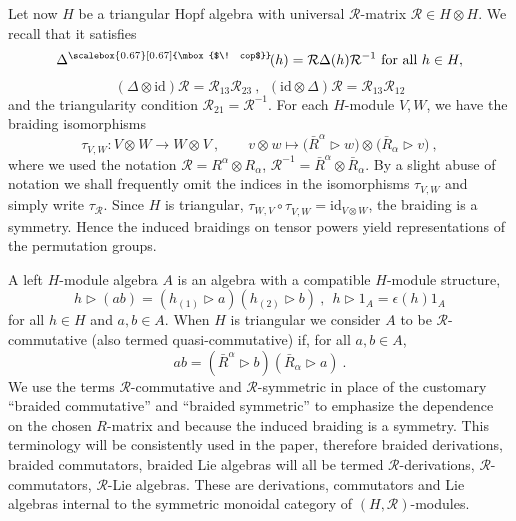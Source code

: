 \documentclass[12pt]{article}
\numberwithin{equation}{section}
\theoremstyle{plain}
\theoremstyle{definition}
\theoremstyle{remark}
\def\ra{\triangleright}
\def\AA{A}
\def\cop{{{\scalebox{0.67}[0.67]{\mbox{$\! cop$}}}\!}}
\def\hxi{h}
\begin{document}
Let now $H$ be a triangular Hopf
algebra with universal 
$\mathcal{R}$-matrix $\mathcal{R}\in H\otimes H$.
We recall that it satisfies
$$
\Delta^{\cop}(\hxi)
=\mathcal{R}\Delta(\hxi)\mathcal{R}^{-1}
\text{ for all }\hxi\in H,
$$
\begin{equation}\label{hexagon}
    (\Delta\otimes\mathrm{id})\mathcal{R}
    =\mathcal{R}_{13}\mathcal{R}_{23}
   ~,~~
    (\mathrm{id}\otimes\Delta)\mathcal{R}
    =\mathcal{R}_{13}\mathcal{R}_{12}
  \end{equation}
  and the triangularity condition ${\mathcal{R}}_{21}={\mathcal{R}}^{-1}$.
For each $H$-module $V,W$, we have the braiding isomorphisms
\begin{equation}\label{taubraiding}
\tau^{}_{V,W}: V \otimes^{} W \longrightarrow W \otimes^{} V ~, \qquad v \otimes^{} w 
\longmapsto 
\big(\bar R^{\alpha} \ra w\big) \otimes^{} \big(\bar R_{\alpha} \ra
v\big)~,
\end{equation}
where we used the notation $\mathcal{R}=R^\alpha\otimes R_\alpha$,
$\mathcal{R}^{-1}=\bar R^\alpha\otimes \bar R_\alpha$.
By a slight abuse of notation we  shall frequently omit the indices in the
isomorphisms $\tau^{}_{V,W}$ and simply write $\tau_{{\mathcal{R}}}$.
Since $H$ is triangular,  $\tau_{W,V}\circ \tau^{}_{V, W}=\mathrm{id}_{V\otimes W}$, the braiding is a symmetry. Hence the induced braidings on tensor powers yield representations of the permutation groups.


A left $H$-module algebra $A$ is an algebra with a compatible
$H$-module structure,
$$
\hxi\rhd(a b)=(\hxi_{(1)}\rhd a)(\hxi_{(2)}\rhd b) ~,~~
\hxi\rhd 1_{A}=\epsilon(\hxi)1_{A}
$$
for all $\hxi\in H$ and $a,b\in {A}$. 
When $H$ is triangular  we consider $\AA$ to be  ${\mathcal{R}}$-commutative (also termed quasi-commutative) if, for all $a,b\in \AA$, 
\begin{equation}\label{bsalgA}
  ab=(\bar R^\alpha\ra b)(\bar R_\alpha \ra a)~.
\end{equation}
We use the terms ${\mathcal{R}}$-commutative and ${\mathcal{R}}$-symmetric in place of the customary ``braided commutative'' and ``braided symmetric'' to emphasize the dependence on the chosen $R$-matrix and because  the induced braiding is a symmetry. This terminology will be consistently used in the paper, therefore braided derivations,  braided commutators, braided Lie algebras will all be termed  ${{\mathcal{R}}}$-derivations,  ${{\mathcal{R}}}$-commutators, ${{\mathcal{R}}}$-Lie algebras. These are derivations, commutators and Lie algebras internal to the symmetric monoidal category of $(H,{{\mathcal{R}}})$-modules.  
\\
\end{document}

